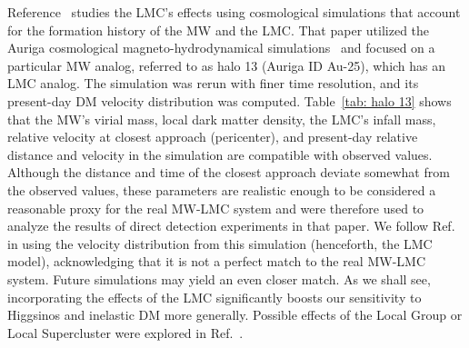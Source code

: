 \documentclass[aps,prd,amsmath,amssymb,10pt,letterpaper,balancelastpage,showpacs,superscriptaddress,nofootinbib,floatfix,notitlepage,longbibliography,twocolumn
]{revtex4-2}
\begin{document}
Reference~\cite{LMC} studies the LMC's effects using cosmological simulations that account for the formation history of the MW and the LMC. That paper utilized the Auriga cosmological magneto-hydrodynamical simulations~\cite{Auriga} and focused on a particular MW analog, referred to as halo 13 (Auriga ID Au-25), which has an LMC analog. The simulation was rerun with finer time resolution, and its present-day DM velocity distribution was computed. Table~\ref{tab: halo 13} shows that the MW's virial mass, local dark matter density, the LMC's infall mass, relative velocity at closest approach (pericenter), and present-day relative distance and velocity in the simulation are compatible with observed values. Although the distance and time of the closest approach deviate somewhat from the observed values, these parameters are realistic enough to be considered a reasonable proxy for the real MW-LMC system and were therefore used to analyze the results of direct detection experiments in that paper. We follow Ref.~\cite{LMC} in using the velocity distribution from this simulation (henceforth, the LMC model), acknowledging that it is not a perfect match to the real MW-LMC system. Future simulations may yield an even closer match. As we shall see, incorporating the effects of the LMC significantly boosts our sensitivity to Higgsinos and inelastic DM more generally. Possible effects of the Local Group or Local Supercluster were explored in Ref.~\cite{localGroup}.
\end{document}
